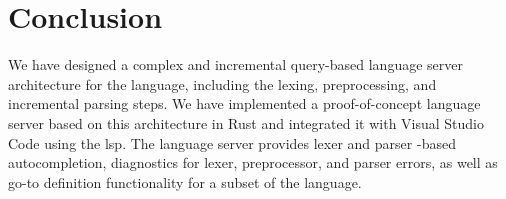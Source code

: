 \chapter*{Conclusion}

We have designed a complex and incremental query-based language server
architecture for the \pfs language, including the lexing, preprocessing, and
incremental parsing steps. We have implemented a proof-of-concept language
server based on this architecture in Rust and integrated it with Visual Studio
Code using the \acrlong{lsp}. The language server provides lexer and parser
-based autocompletion, diagnostics for lexer, preprocessor, and parser errors,
as well as go-to definition functionality for a subset of the \pfs language.

